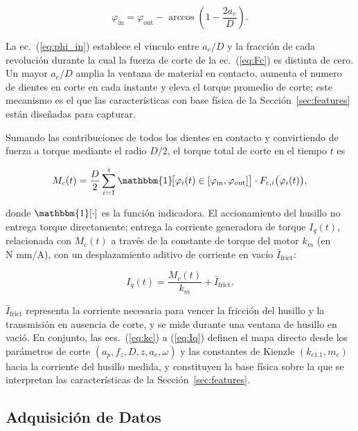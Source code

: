 \documentclass[12pt, letterpaper]{article}
\begin{document}
\begin{equation}
  \varphi_{\text{in}} = \varphi_{\text{out}} - \arccos\!\left(1 - \frac{2a_e}{D}\right).
  \label{eq:phi_in}
\end{equation}

La ec.~(\ref{eq:phi_in}) establece el vinculo entre $a_e/D$ y la fracción de cada revolución durante la cual la fuerza de corte de la ec.~(\ref{eq:Fc}) es distinta de cero. Un mayor $a_e/D$ amplia la ventana de material en contacto, aumenta el numero de dientes en corte en cada instante y eleva el torque promedio de corte; este mecanismo es el que las características con base física de la Sección~\ref{sec:features} están diseñadas para capturar.

Sumando las contribuciones de todos los dientes en contacto y convirtiendo de fuerza a torque mediante el radio $D/2$, el torque total de corte en el tiempo $t$ es

\begin{equation}
  M_c(t) = \frac{D}{2} \sum_{i=1}^{z} \mathbbm{1}\!\bigl[\varphi_i(t) \in [\varphi_{\text{in}},\varphi_{\text{out}}]\bigr] \cdot F_{c,i}\bigl(\varphi_i(t)\bigr),
  \label{eq:Mc}
\end{equation}

donde $\mathbbm{1}[\cdot]$ es la función indicadora. El accionamiento del husillo no entrega torque directamente; entrega la corriente generadora de torque $I_q(t)$, relacionada con $M_c(t)$ a través de la constante de torque del motor $k_m$ (en $\text{N mm}/\text{A}$), con un desplazamiento aditivo de corriente en vacío $\bar{I}_{\text{frict}}$:

\begin{equation}
  I_q(t) = \frac{M_c(t)}{k_m} + \bar{I}_{\text{frict}}.
  \label{eq:Iq}
\end{equation}

$\bar{I}_{\text{frict}}$ representa la corriente necesaria para vencer la fricción del husillo y la transmisión en ausencia de corte, y se mide durante una ventana de husillo en vació. En conjunto, las ecs.~(\ref{eq:kc}) a (\ref{eq:Iq}) definen el mapa directo desde los parámetros de corte $(a_p, f_z, D, z, a_e, \omega)$ y las constantes de Kienzle $(k_{c1.1}, m_c)$ hacia la corriente del husillo medida, y constituyen la base física sobre la que se interpretan las características de la Sección~\ref{sec:features}.

\subsection{Adquisición de Datos}
\end{document}
